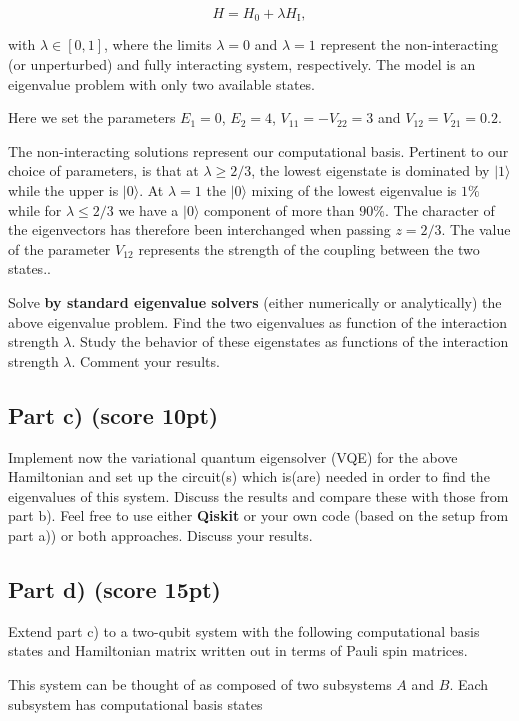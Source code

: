 \documentclass[%
oneside,                 %
final,                   %
10pt]{article}
\begin{document}
\[
H=H_0+\lambda H_\mathrm{I},
\]

with $\lambda \in [0,1]$, where the limits $\lambda=0$ and $\lambda=1$
represent the non-interacting (or unperturbed) and fully interacting
system, respectively.  The model is an eigenvalue problem with only
two available states.

Here we set the parameters $E_1=0$,
$E_2=4$, $V_{11}=-V_{22}=3$ and $V_{12}=V_{21}=0.2$.

The non-interacting solutions represent our computational basis.
Pertinent to our choice of parameters, is that at $\lambda\geq 2/3$,
the lowest eigenstate is dominated by $\vert 1\rangle$ while the upper
is $\vert 0 \rangle$. At $\lambda=1$ the $\vert 0 \rangle$ mixing of
the lowest eigenvalue is $1\%$ while for $\lambda\leq 2/3$ we have a
$\vert 0 \rangle$ component of more than $90\%$.  The character of the
eigenvectors has therefore been interchanged when passing $z=2/3$. The
value of the parameter $V_{12}$ represents the strength of the coupling
between the two states..

Solve \textbf{by standard eigenvalue solvers} (either numerically or analytically) the above eigenvalue problem.
Find the two eigenvalues as function of the interaction strength $\lambda$.
Study the behavior of these eigenstates as functions of the interaction strength $\lambda$.
Comment your results.

\subsection*{Part c) (score 10pt)}

Implement now the variational quantum eigensolver (VQE) for the above
Hamiltonian and set up the circuit(s) which is(are) needed in order to find
the eigenvalues of this system. Discuss the results and compare these
with those from part b). Feel free to use either \textbf{Qiskit} or your own
code (based on the setup from part a)) or both approaches. Discuss
your results.

\subsection*{Part d) (score 15pt)}

Extend part c) to a two-qubit system with the following computational
basis states and Hamiltonian matrix written out in terms of Pauli spin
matrices.

This system can be thought of as composed of two subsystems
$A$ and $B$. Each subsystem has computational basis states
\end{document}
